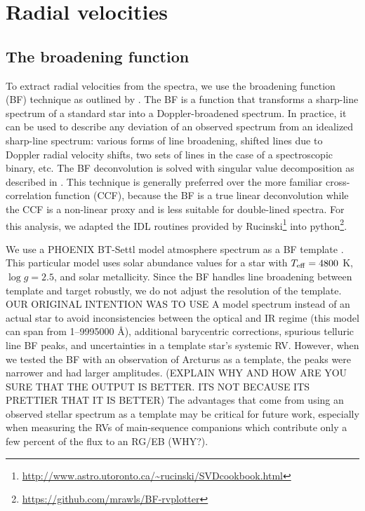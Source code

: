 \section{Radial velocities}\label{rvs}
\subsection{The broadening function}\label{bf}
To extract radial velocities from the spectra, we use the broadening function (BF) technique as outlined by \citet{ruc02}. The BF is a function that transforms a sharp-line spectrum of a standard star into a Doppler-broadened spectrum. In practice, it can be used to describe any deviation of an observed spectrum from an idealized sharp-line spectrum: various forms of line broadening, shifted lines due to Doppler radial velocity shifts, two sets of lines in the case of a spectroscopic binary, etc. The BF deconvolution is solved with singular value decomposition as described in \citet{ruc02}. This technique is generally preferred over the more familiar cross-correlation function (CCF), because the BF is a true linear deconvolution while the CCF is a non-linear proxy and is less suitable for double-lined spectra. For this analysis, we adapted the IDL routines provided by Rucinski\footnote{\url{http://www.astro.utoronto.ca/~rucinski/SVDcookbook.html}} into python\footnote{\url{https://github.com/mrawls/BF-rvplotter}}.

We use a PHOENIX BT-Settl model atmosphere spectrum as a BF template \citep{all03}. This particular model uses \citet{Asplund_2009} solar abundance values for a star with $T_{\rm{eff}} = 4800$ K, $\log g = 2.5$, and solar metallicity. Since the BF handles line broadening between template and target robustly, we do not adjust the resolution of the template. OUR ORIGINAL INTENTION WAS TO USE A model spectrum instead of an actual star to avoid inconsistencies between the optical and IR regime (this model can span from 1--9995000 \AA), additional barycentric corrections, spurious telluric line BF peaks, and uncertainties in a template star's systemic RV. However, when we tested the BF with an observation of Arcturus as a template, the peaks were narrower and had larger amplitudes. (EXPLAIN WHY AND HOW ARE YOU SURE THAT THE OUTPUT IS BETTER. ITS NOT BECAUSE ITS PRETTIER THAT IT IS BETTER) The advantages that come from using an observed stellar spectrum as a template may be critical for future work, especially when measuring the RVs of main-sequence companions which contribute only a few percent of the flux to an RG/EB (WHY?).

